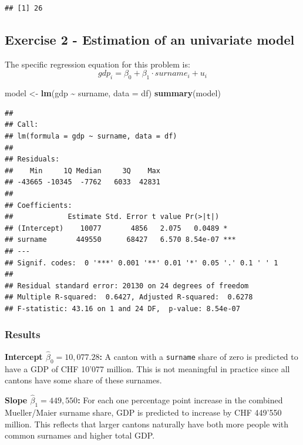 \documentclass[
]{article}
\newenvironment{Shaded}{\begin{snugshade}}{\end{snugshade}}
\newcommand{\AttributeTok}[1]{\textcolor[rgb]{0.13,0.29,0.53}{#1}}
\newcommand{\FunctionTok}[1]{\textcolor[rgb]{0.13,0.29,0.53}{\textbf{#1}}}
\newcommand{\NormalTok}[1]{#1}
\newcommand{\OtherTok}[1]{\textcolor[rgb]{0.56,0.35,0.01}{#1}}
\newcommand{\SpecialCharTok}[1]{\textcolor[rgb]{0.81,0.36,0.00}{\textbf{#1}}}
\begin{document}
\begin{verbatim}
## [1] 26
\end{verbatim}

\subsection{Exercise 2 - Estimation of an univariate
model}\label{exercise-2---estimation-of-an-univariate-model}

The specific regression equation for this problem is:
\[gdp_i = \beta_0 + \beta_1 \cdot surname_i + u_i\]

\begin{Shaded}
\begin{Highlighting}[]
\NormalTok{model }\OtherTok{\textless{}{-}} \FunctionTok{lm}\NormalTok{(gdp }\SpecialCharTok{\textasciitilde{}}\NormalTok{ surname, }\AttributeTok{data =}\NormalTok{ df)}
\FunctionTok{summary}\NormalTok{(model)}
\end{Highlighting}
\end{Shaded}

\begin{verbatim}
## 
## Call:
## lm(formula = gdp ~ surname, data = df)
## 
## Residuals:
##    Min     1Q Median     3Q    Max 
## -43665 -10345  -7762   6033  42831 
## 
## Coefficients:
##             Estimate Std. Error t value Pr(>|t|)    
## (Intercept)    10077       4856   2.075   0.0489 *  
## surname       449550      68427   6.570 8.54e-07 ***
## ---
## Signif. codes:  0 '***' 0.001 '**' 0.01 '*' 0.05 '.' 0.1 ' ' 1
## 
## Residual standard error: 20130 on 24 degrees of freedom
## Multiple R-squared:  0.6427, Adjusted R-squared:  0.6278 
## F-statistic: 43.16 on 1 and 24 DF,  p-value: 8.54e-07
\end{verbatim}

\subsubsection{Results}\label{results}

\textbf{Intercept \(\hat{\beta}_0 = 10,077.28\):} A canton with a
\texttt{surname} share of zero is predicted to have a GDP of CHF 10'077
million. This is not meaningful in practice since all cantons have some
share of these surnames.

\textbf{Slope \(\hat{\beta}_1 = 449,550\):} For each one percentage
point increase in the combined Mueller/Maier surname share, GDP is
predicted to increase by CHF 449'550 million. This reflects that larger
cantons naturally have both more people with common surnames and higher
total GDP.
\end{document}
